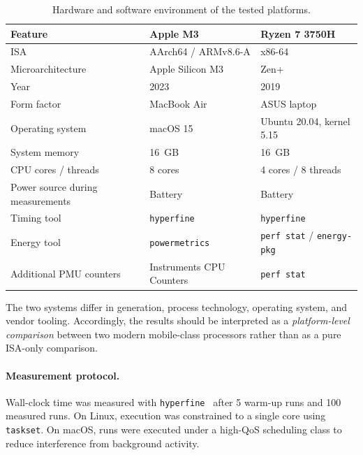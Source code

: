 \documentclass{tcsa}
\begin{document}
\begin{table}[!ht]
\centering
\caption{Hardware and software environment of the tested platforms.}
\label{tab:hardware}
\small %
\begin{tabularx}{\columnwidth}{lXX}
\toprule
Feature & Apple M3  & Ryzen 7 3750H  \\
\midrule

ISA & AArch64 / ARMv8.6-A & x86-64 \\
Microarchitecture & Apple Silicon M3 & Zen+ \\
Year & 2023 & 2019 \\
Form factor & MacBook Air & ASUS laptop \\
Operating system & macOS 15 & Ubuntu 20.04, kernel 5.15 \\
System memory & 16~GB & 16~GB \\
CPU cores / threads & 8 cores & 4 cores / 8 threads \\
Power source during measurements & Battery & Battery \\
Timing tool & \texttt{hyperfine} & \texttt{hyperfine} \\
Energy tool & \texttt{powermetrics} & \texttt{perf stat} / \texttt{energy-pkg} \\
Additional PMU counters & Instruments CPU Counters & \texttt{perf stat} \\
\bottomrule
\end{tabularx}
\end{table}





The two systems differ in generation, process technology, operating
system, and vendor tooling. Accordingly, the results should be
interpreted as a \emph{platform-level comparison} between two modern
mobile-class processors rather than as a pure ISA-only comparison.

\paragraph{Measurement protocol.}
Wall-clock time was measured with \texttt{hyperfine}~\cite{hyperfine}
after 5 warm-up runs and 100 measured runs. On Linux, execution was
constrained to a single core using \texttt{taskset}. On macOS, runs
were executed under a high-QoS scheduling class to reduce interference
from background activity.
\end{document}
